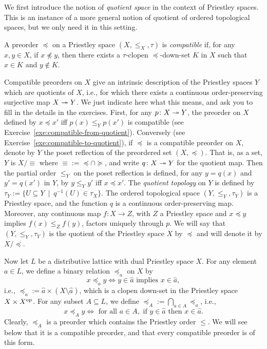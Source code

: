 We first introduce the notion of \emph{quotient space} in the context of Priestley spaces. This is an instance of a more general notion of quotient of ordered topological spaces, but we only need it in this setting.
\begin{definition}\label{def:compatible}
A preorder $\preceq$ on a Priestley space $(X, \leq_X, \tau)$ is \emph{compatible} if, for any $x, y \in X$, if $x \not\preceq y$, then there exists a $\tau$-clopen $\preceq$-down-set $K$ in $X$ such that $x \in K$ and $y \not\in K$.
\end{definition}
Compatible preorders on $X$ give an intrinsic description of the Priestley spaces $Y$ which are quotients of $X$, i.e., for which there exists a continuous order-preserving surjective map $X \twoheadrightarrow Y$. We just indicate here what this means, and ask you to fill in the details in the exercises. First, for any $p \colon X \twoheadrightarrow Y$, the preorder on $X$ defined by $x \preceq x'$ iff $p(x) \leq_Y p(x')$ is compatible (see Exercise~\ref{exe:compatible-from-quotient}). Conversely (see Exercise~\ref{exe:compatible-to-quotient}), if $\preceq$ is a compatible preorder on $X$, denote by $Y$ the poset reflection of the preordered set $(X,\preceq)$. That is, as a set,  $Y$ is $X/\equiv$ where ${\equiv} := {\preceq \cap \succeq}$, and write $q \colon X \twoheadrightarrow Y$ for the quotient map. Then the partial order $\leq_Y$ on the poset reflection is defined, for any $y = q(x)$ and $y' = q(x')$ in $Y$, by $y \leq_Y y'$ iff $x \preceq x'$. The \emph{quotient topology} on $Y$ is defined by $\tau_Y := \{U \subseteq Y \ \mid \ q^{-1}(U) \in \tau_X\}$. The ordered topological space $(Y, \leq_Y, \tau_Y)$ is a Priestley space, and the function $q$ is a continuous order-preserving map. Moreover, any continuous map $f \colon X \to Z$, with $Z$ a Priestley space and $x \preceq y$ implies $f(x) \leq_Z f(y)$, factors uniquely through $p$. We will say that $(Y, \leq_Y, \tau_Y)$ is the quotient of the Priestley space $X$ by $\preceq$ and will denote it by $X/{\preceq}$.

Now let $L$ be a distributive lattice with dual Priestley space $X$. For any element $a \in L$,  we define a binary relation $\preceq_a$ on $X$ by
\[ x \preceq_a y \iff y \in \widehat{a} \text{ implies } x \in \widehat{a},\]
i.e., ${\preceq_a} := \widehat{a} \times (X \setminus \widehat{a})$, which is a clopen down-set in the Priestley space $X \times X^{\mathrm{op}}$. For any subset $A \subseteq L$, we define ${\preceq_{A}} := \bigcap_{a \in A} {\preceq_a}$, i.e.,
\[ x \preceq_A y \iff \text{ for all } a \in A, \text{ if } y \in \widehat{a} \text{ then } x \in \widehat{a}.\]
Clearly, $\preceq_A$ is a preorder which contains the Priestley order $\leq$. We will see below that it is a compatible preorder, and that every compatible preorder is of this form.%

